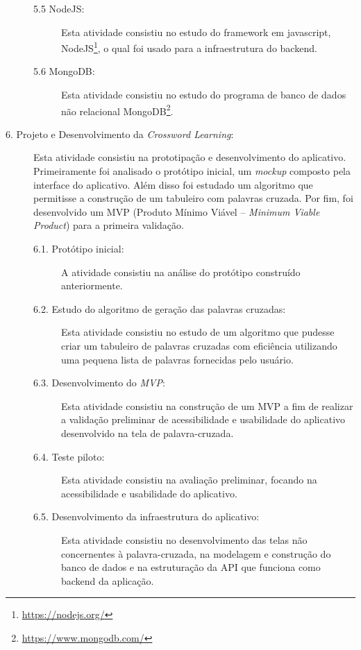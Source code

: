 \begin{description}
\begin{description}
\item[5.5 NodeJS:] Esta atividade consistiu no estudo do framework em javascript, NodeJS\footnote{\url{https://nodejs.org/}}, o qual foi usado para a infraestrutura do backend.

\item[5.6 MongoDB:] Esta atividade consistiu no estudo do programa de banco de dados não relacional MongoDB\footnote{\url{https://www.mongodb.com/}}.

\end{description}

\item[6. Projeto e Desenvolvimento da \textit{Crossword Learning}:]
Esta atividade consistiu na prototipação e desenvolvimento do aplicativo. Primeiramente foi analisado o protótipo inicial, um \textit{mockup} composto pela interface do aplicativo. Além disso foi estudado um algoritmo que permitisse a construção de um tabuleiro com palavras cruzada. Por fim, foi desenvolvido um MVP (Produto Mínimo Viável -- \textit{Minimum Viable Product})  para a primeira validação.

\begin{description}
    \item[6.1. Protótipo inicial:]
    A atividade consistiu na análise do protótipo construído anteriormente.
    
    \item[6.2. Estudo do algoritmo de geração das palavras cruzadas:]
    Esta atividade consistiu no estudo de um algoritmo que pudesse criar um tabuleiro de palavras cruzadas com eficiência utilizando uma pequena lista de palavras fornecidas pelo usuário.
    
    \item[6.3. Desenvolvimento do \textit{MVP}:] 
    Esta atividade consistiu na construção de um MVP a fim de realizar a validação preliminar de acessibilidade e usabilidade do aplicativo desenvolvido na tela de palavra-cruzada.
    
    \item[6.4. Teste piloto:] 
    Esta atividade consistiu na avaliação preliminar, focando na acessibilidade e usabilidade do aplicativo.
    
    \item[6.5. Desenvolvimento da infraestrutura do aplicativo:] 
    Esta atividade consistiu no desenvolvimento das telas não concernentes à palavra-cruzada, na modelagem e construção do banco de dados e na estruturação da API que funciona como backend da aplicação.
    

\end{description}
\end{description}
